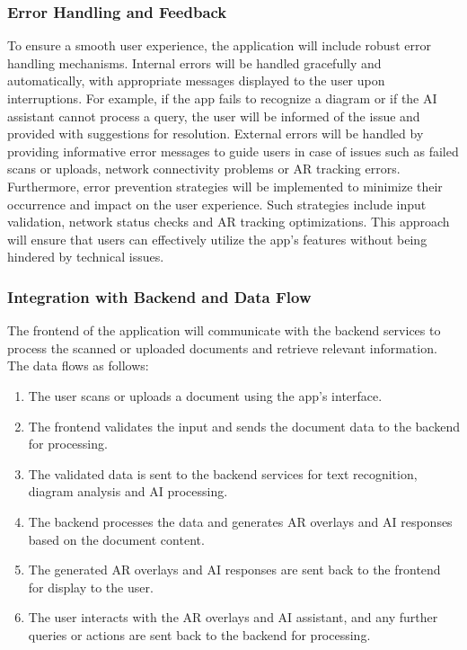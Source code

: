 \documentclass[12pt]{article}
\begin{document}
    \subsubsection{Error Handling and Feedback}

        To ensure a smooth user experience, the application will include robust error handling mechanisms. Internal errors will be handled gracefully and automatically, with appropriate messages displayed to the user upon interruptions. For example, if the app fails to recognize a diagram or if the AI assistant
        cannot process a query, the user will be informed of the issue and provided with suggestions for resolution. External errors will be handled by providing informative error messages to guide users in case of issues such as failed scans or uploads, network connectivity problems or AR tracking errors. Furthermore,
        error prevention strategies will be implemented to minimize their occurrence and impact on the user experience. Such strategies include input validation, network status checks and AR tracking optimizations. This approach will ensure that users can effectively utilize the app's features without being hindered by technical issues.



    \subsubsection{Integration with Backend and Data Flow}

        The frontend of the application will communicate with the backend services to process the scanned or uploaded documents and retrieve relevant information. The data flows as follows:
        \begin{enumerate}
            \item The user scans or uploads a document using the app's interface.
            \item The frontend validates the input and sends the document data to the backend for processing.
            \item The validated data is sent to the backend services for text recognition, diagram analysis and AI processing.
            \item The backend processes the data and generates AR overlays and AI responses based on the document content.
            \item The generated AR overlays and AI responses are sent back to the frontend for display to the user.
            \item The user interacts with the AR overlays and AI assistant, and any further queries or actions are sent back to the backend for processing.
        \end{enumerate}
        
\end{document}
